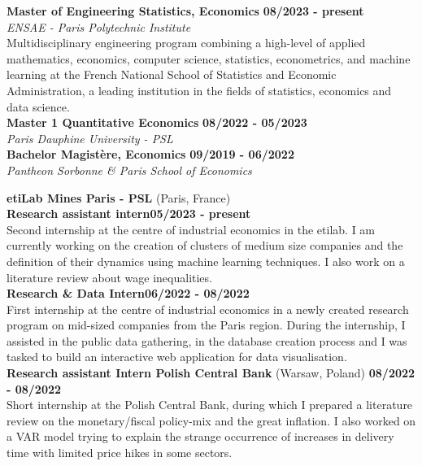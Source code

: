 \documentclass[11pt]{report}
\begin{document}
	
\noindent\textbf{Master of Engineering \textbar\space Statistics,  Economics}
\hfill
\textbf{08/2023 - present} \\
\emph{ENSAE - Paris Polytechnic Institute}\\
Multidisciplinary engineering program combining a high-level of applied mathematics, economics, computer science, statistics, econometrics, and machine learning at the French National School of Statistics and Economic Administration, a leading institution in the fields of statistics, economics and data science.  \\

\noindent\textbf{Master 1 \textbar\space Quantitative Economics}
\hfill
\textbf{08/2022 - 05/2023} \\
\emph{Paris Dauphine University - PSL}\\

\noindent\textbf{Bachelor \textbar\space Magistère, Economics}
\hfill
\textbf{09/2019 - 06/2022} \\
\emph{Pantheon Sorbonne \& Paris School of Economics}


	\begin{flushleft}
	 \hrulefill
	\end{flushleft}


\noindent\textbf{etiLab Mines Paris - PSL} (Paris, France)\\[0.15cm]
\textbf{Research assistant intern}\hfill \textbf{05/2023 - present} \\
Second internship at the centre of industrial economics in the etilab. I am currently working on the creation of clusters of medium size companies and the definition of their dynamics using machine learning techniques. I also work on a literature review about wage inequalities. \\[0.15cm]
\textbf{Research \& Data Intern}\hfill \textbf{06/2022 - 08/2022} \\
First internship at the centre of industrial economics in a newly created research program on mid-sized companies from the Paris region. During the internship, I assisted in the public data gathering, in the database
creation process and I was tasked to build an interactive web application for data visualisation.\\

\noindent\textbf{Research assistant Intern \textbar\space Polish Central Bank} (Warsaw, Poland)
\hfill
\textbf{08/2022 - 08/2022} \\
Short internship at the Polish Central Bank, during which I prepared a literature review on the monetary/fiscal policy-mix and the great inflation. I also worked on a VAR model trying to explain the strange occurrence of increases in delivery time with limited price hikes in some sectors.  \\
\end{document}

